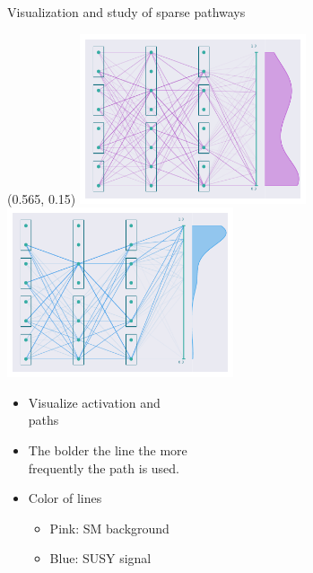 \documentclass[UKenglish]{beamer}
\begin{document}
\begin{frame}[noframenumbering]{Visualization and study of sparse pathways}
    \begin{textblock}{0.8}(0.565, 0.15)
        \includegraphics[width = 0.5\textwidth]{figures/NetworkVis/AfterTrainingBkg.pdf}
        \includegraphics[width = 0.5\textwidth]{figures/NetworkVis/AfterTrainingSig.pdf}
    \end{textblock}
    \begin{itemize}
        \item Visualize activation and \\
        paths
        \item The bolder the line the more\\ 
        frequently the path is used.
        \item Color of lines 
        \begin{itemize}
            \item Pink: SM background
            \item Blue: SUSY signal
        \end{itemize}
    \end{itemize}
\end{frame}
\end{document}
